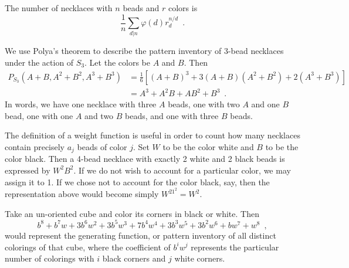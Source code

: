 \begin{example} \cite[89]{Aigner2007} The number of necklaces with $n$ beads and $r$ colors is
$$
\frac{1}{n} \sum_{d | n} \varphi(d) r_d^{n / d} \enspace.
$$
\end{example}

\begin{example} We use Polya's theorem to describe the pattern inventory of 3-bead necklaces under the action of $S_3$. Let the colors be $A$ and $B$. Then
$$
\begin{align}
P_{S_3}(A + B, A^2 + B^2, A^3 + B^3)
& = \frac{1}{6}[(A + B)^3 + 3 (A + B) (A^2 + B^2) + 2 (A^3 + B^3)] \\
& = A^3 + A^2 B + A B^2 + B^3 \enspace.
\end{align}
$$
In words, we have one necklace with three $A$ beads, one with two $A$ and one $B$ bead, one with one $A$ and two $B$ beads, and one with three $B$ beads.
\end{example}

\begin{example} The definition of a weight function is useful in order to count how many necklaces contain precisely $a_j$ beads of color $j$. Set $W$ to be the color white and $B$ to be the color black. Then a 4-bead necklace with exactly 2 white and 2 black beads is expressed by $W^2B^2$. If we do not wish to account for a particular color, we may assign it to 1. If we chose not to account for the color black, say, then the representation above would become simply $W^21^2 = W^2$.
\end{example}

\begin{example} \cite{Tucker1974} Take an un-oriented cube and color its corners in black or white. Then
$$
b^8 + b^7w + 3b^6w^2 + 3b^5w^3 + 7b^4w^4 + 3b^3w^5 + 3b^2w^6 + bw^7 + w^8 \enspace,
$$
would represent the generating function, or pattern inventory of all distinct colorings of that cube, where the coefficient of $b^iw^j$ represents the particular number of colorings with $i$ black corners and $j$ white corners.
\end{example}
